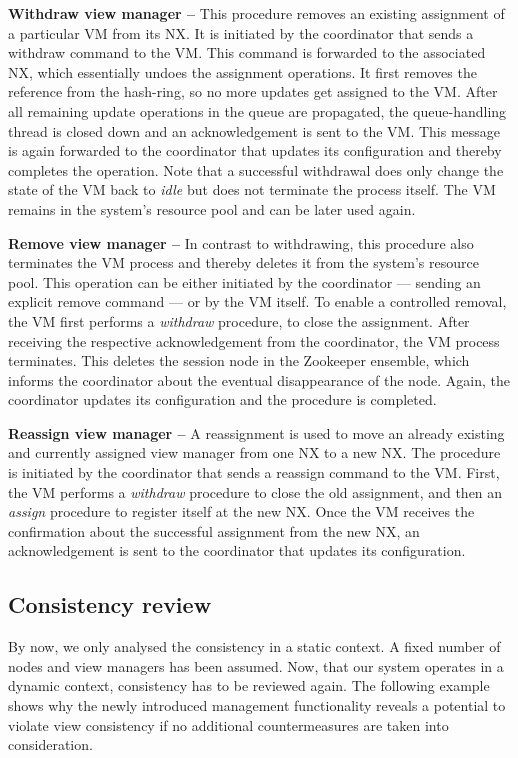 \noindent
\textbf{Withdraw view manager -- } This procedure removes an existing 
assignment of a particular VM from its NX. It is initiated by the 
coordinator that sends a withdraw command to the VM. This command is 
forwarded to the associated NX, which essentially undoes the assignment 
operations. It first removes the reference from the hash-ring, so no 
more updates get assigned to the VM. After all remaining update 
operations in the queue are propagated, the queue-handling thread is 
closed down and an acknowledgement is sent to the VM. This message is 
again forwarded to the coordinator that updates its configuration and 
thereby completes the operation. Note that a successful withdrawal does 
only change the state of the VM back to \textit{idle} but does not 
terminate the process itself. The VM remains in the system's resource 
pool and can be later used again. 

\noindent
\textbf{Remove view manager -- } In contrast to withdrawing, this 
procedure also terminates the VM process and thereby deletes it from the 
system's resource pool. This operation can be either initiated by the 
coordinator --- sending an explicit remove command --- or by the VM 
itself. To enable a controlled removal, the VM first performs a 
\textit{withdraw} procedure, to close the assignment. After receiving 
the respective acknowledgement from the coordinator, the VM process 
terminates. This deletes the session node in the Zookeeper ensemble, 
which informs the coordinator about the eventual disappearance of the 
node. Again, the coordinator updates its configuration and the procedure 
is completed. 

\noindent
\textbf{Reassign view manager -- } A reassignment is used to move an 
already existing and currently assigned view manager from one NX to a 
new NX. The procedure is initiated by the coordinator that sends a 
reassign command to the VM. First, the VM performs a \textit{withdraw} 
procedure to close the old assignment, and then an \textit{assign} 
procedure to register itself at the new NX. Once the VM receives the 
confirmation about the successful assignment from the new NX, an 
acknowledgement is sent to the coordinator that updates its 
configuration. 

\subsection{Consistency review} 
\label{subsec:consistency_review} 

By now, we only analysed the consistency in a static context. A fixed 
number of nodes and view managers has been assumed. Now, that our system 
operates in a dynamic context, consistency has to be reviewed again. The 
following example shows why the newly introduced management functionality 
reveals a potential to violate view consistency if no additional 
countermeasures are taken into consideration. 

